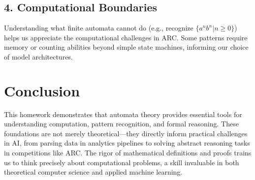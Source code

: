 \documentclass[12pt]{article}
\theoremstyle{definition}
\begin{document}
\subsection*{4. Computational Boundaries}
Understanding what finite automata cannot do (e.g., recognize $\{a^n b^n | n \geq 0\}$) helps us appreciate the computational challenges in ARC. Some patterns require memory or counting abilities beyond simple state machines, informing our choice of model architectures.

\section*{Conclusion}
This homework demonstrates that automata theory provides essential tools for understanding computation, pattern recognition, and formal reasoning. These foundations are not merely theoretical—they directly inform practical challenges in AI, from parsing data in analytics pipelines to solving abstract reasoning tasks in competitions like ARC. The rigor of mathematical definitions and proofs trains us to think precisely about computational problems, a skill invaluable in both theoretical computer science and applied machine learning.
\end{document}
